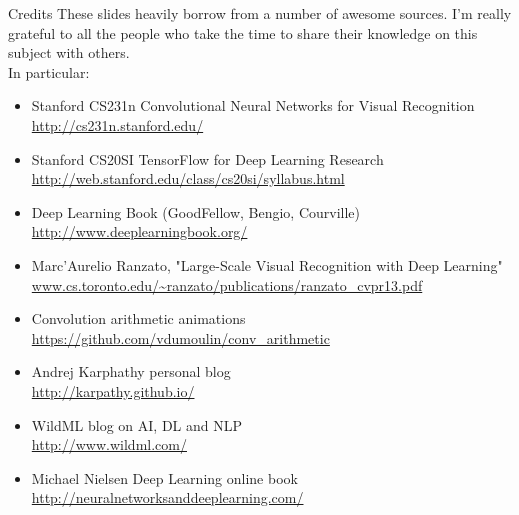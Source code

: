\begin{frame}[t, allowframebreaks]{Credits}
These slides heavily borrow from a number of awesome sources. I'm really grateful to all the people who take the time to share their knowledge on this subject with others.\\
\vspace{0.5cm}
In particular:
\begin{itemize}
\item Stanford CS231n Convolutional Neural Networks for Visual Recognition\\
\url{http://cs231n.stanford.edu/}
\item Stanford CS20SI TensorFlow for Deep Learning Research\\
\url{http://web.stanford.edu/class/cs20si/syllabus.html}
\item Deep Learning Book (GoodFellow, Bengio, Courville)\\
\url{http://www.deeplearningbook.org/}
\item Marc'Aurelio Ranzato, "Large-Scale Visual Recognition with Deep Learning"\\
\url{www.cs.toronto.edu/~ranzato/publications/ranzato_cvpr13.pdf}
\item Convolution arithmetic animations\\
\url{https://github.com/vdumoulin/conv_arithmetic}
\item Andrej Karphathy personal blog\\
\url{http://karpathy.github.io/}
\item WildML blog on AI, DL and NLP\\
\url{http://www.wildml.com/}
\item Michael Nielsen Deep Learning online book
\url{http://neuralnetworksanddeeplearning.com/}
\end{itemize}
\end{frame}